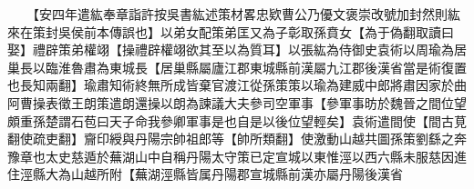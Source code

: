 　　【安四年遣紘奉章詣許按吳書紘述策材畧忠欵曹公乃優文褒崇改號加封然則紘來在策封吳侯前本傳誤也】以弟女配策弟匡又為子彰取孫賁女【為于偽翻取讀曰娶】禮辟策弟權翊【操禮辟權翊欲其至以為質耳】以張紘為侍御史袁術以周瑜為居巢長以臨淮魯肅為東城長【居巢縣屬廬江郡東城縣前漢屬九江郡後漢省當是術復置也長知兩翻】瑜肅知術終無所成皆棄官渡江從孫策策以瑜為建威中郎將肅因家於曲阿曹操表徵王朗策遣朗還操以朗為諫議大夫參司空軍事【參軍事昉於魏晉之間位望頗重孫楚謂石苞曰天子命我參卿軍事是也自是以後位望輕矣】袁術遣間使【間古莧翻使疏吏翻】齎印綬與丹陽宗帥祖郎等【帥所類翻】使激動山越共圖孫策劉繇之奔豫章也太史慈遁於蕪湖山中自稱丹陽太守策已定宣城以東惟涇以西六縣未服慈因進住涇縣大為山越所附【蕪湖涇縣皆属丹陽郡宣城縣前漢亦屬丹陽後漢省